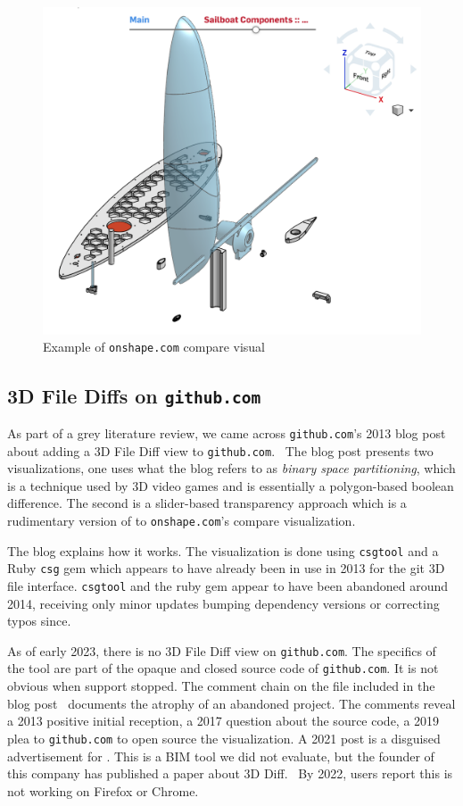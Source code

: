 \documentclass[sigconf,authorversion,nonacm]{acmart}
\begin{document}
\begin{figure}[t]
	\includegraphics[width=\linewidth]{onshapescreenshot.png}
	\caption{Example of \texttt{onshape.com} compare visual}
	\label{fig:onshapescreenshot}
\end{figure}

\subsection{3D File Diffs on \texttt{github.com}}

As part of a grey literature review, we came across \texttt{github.com}'s 2013 blog post about adding a 3D File Diff view to \texttt{github.com}.~\cite{github_blog_2013}
The blog post presents two visualizations, one uses what the blog refers to as \emph{binary space partitioning}, which is a technique used by 3D video games and is essentially a polygon-based boolean difference.
The second is a slider-based transparency approach which is a rudimentary version of to \texttt{onshape.com}'s compare visualization.

The blog explains how it works.
The visualization is done using \texttt{csgtool} and a Ruby \texttt{csg} gem which appears to have already been in use in 2013 for the git 3D file interface.
\texttt{csgtool} and the ruby gem appear to have been abandoned around 2014, receiving only minor updates bumping dependency versions or correcting typos since.

As of early 2023, there is no 3D File Diff view on \texttt{github.com}.
The specifics of the tool are part of the opaque and closed source code of \texttt{github.com}.
It is not obvious when support stopped.
The comment chain on the file included in the blog post~\cite{death_of_a_diffsman} documents the atrophy of an abandoned project.
The comments reveal a 2013 positive initial reception, a 2017 question about the source code, a 2019 plea to \texttt{github.com} to open source the visualization.
A 2021 post is a disguised advertisement for \citet{3drepoblog}.
This is a BIM tool we did not evaluate, but the founder of this company has published a paper about 3D Diff.~\cite{Dobos}
By 2022, users report this is not working on Firefox or Chrome.
\end{document}
